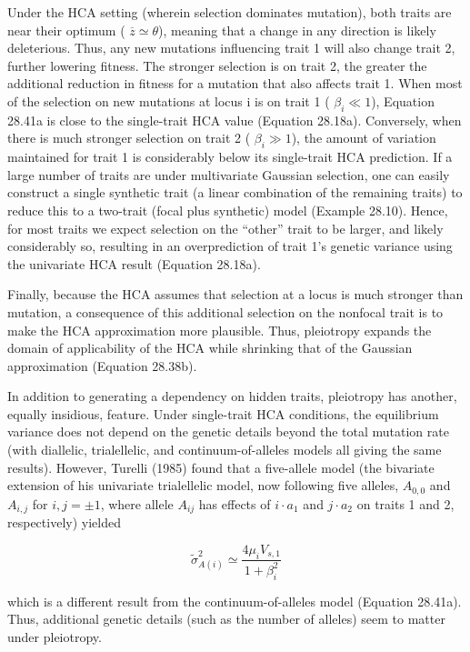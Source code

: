 \documentclass{article}
\begin{document}
Under the HCA setting (wherein selection dominates mutation), both traits are near their optimum ( $ \overline{z} \simeq \theta $), meaning that a change in any direction is likely deleterious. Thus, any new mutations influencing trait 1 will also change trait 2, further lowering fitness. The stronger selection is on trait 2, the greater the additional reduction in fitness for a mutation that also affects trait 1. When most of the selection on new mutations at locus i is on trait 1 ( $ \beta_i \ll 1 $), Equation 28.41a is close to the single-trait HCA value (Equation 28.18a). Conversely, when there is much stronger selection on trait 2 ( $ \beta_i \gg 1 $), the amount of variation maintained for trait 1 is considerably below its single-trait HCA prediction. If a large number of traits are under multivariate Gaussian selection, one can easily construct a single synthetic trait (a linear combination of the remaining traits) to reduce this to a two-trait (focal plus synthetic) model (Example 28.10). Hence, for most traits we expect selection on the “other” trait to be larger, and likely considerably so, resulting in an overprediction of trait 1’s genetic variance using the univariate HCA result (Equation 28.18a).

Finally, because the HCA assumes that selection at a locus is much stronger than mutation, a consequence of this additional selection on the nonfocal trait is to make the HCA approximation more plausible. Thus, pleiotropy expands the domain of applicability of the HCA while shrinking that of the Gaussian approximation (Equation 28.38b).

In addition to generating a dependency on hidden traits, pleiotropy has another, equally insidious, feature. Under single-trait HCA conditions, the equilibrium variance does not depend on the genetic details beyond the total mutation rate (with diallelic, trialellelic, and continuum-of-alleles models all giving the same results). However, Turelli (1985) found that a five-allele model (the bivariate extension of his univariate trialellelic model, now following five alleles,  $ A_{0,0} $ and  $ A_{i,j} $ for  $ i,j=\pm1 $, where allele  $ A_{ij} $ has effects of  $ i\cdot a_{1} $ and  $ j\cdot a_{2} $ on traits 1 and 2, respectively) yielded

\begin{equation}
\widetilde{\sigma}_{A(i)}^{2}\simeq\frac{4\mu_{i}V_{s,1}}{1+\beta_{i}^{2}}
\tag{28.42}
\label{eq:28_42}
\end{equation}

which is a different result from the continuum-of-alleles model (Equation 28.41a). Thus, additional genetic details (such as the number of alleles) seem to matter under pleiotropy.
\end{document}
